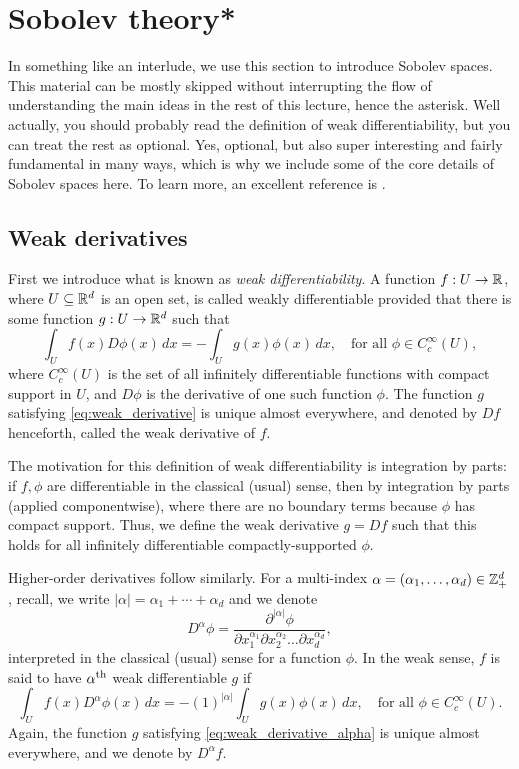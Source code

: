 \documentclass{article}
\begin{document}
\section{Sobolev theory*}

In something like an interlude, we use this section to introduce Sobolev
spaces. This material can be mostly skipped without interrupting the flow of
understanding the main ideas in the rest of this lecture, hence the
asterisk. Well actually, you should probably read the definition of weak
differentiability, but you can treat the rest as optional. Yes, optional, but
also super interesting and fairly fundamental in many ways, which is why we
include some of the core details of Sobolev spaces here. To learn more, an
excellent reference is \citet{evans2010partial}.  

\subsection{Weak derivatives}

First we introduce what is known as \emph{weak differentiability}. A function $f
: U \to \mathbb{R}$, where $U \subseteq \mathbb{R}^d$ is an open set, is called weakly
differentiable provided that there is some function $g : U \to \mathbb{R}^d$ such that
\begin{equation}
\label{eq:weak_derivative}
\int_U f(x) D \phi(x) \, dx = - \int_U g(x) \phi(x) \, dx,
\quad \text{for all $\phi \in C_c^\infty(U)$}, 
\end{equation}
where $C_c^\infty(U)$ is the set of all infinitely differentiable functions with
compact support in $U$, and $D\phi$ is the derivative of one such function
$\phi$. The function $g$ satisfying \eqref{eq:weak_derivative} is unique almost
everywhere, and denoted by $Df$ henceforth, called the weak derivative of $f$.

The motivation for this definition of weak differentiability is integration by
parts: if $f,\phi$ are differentiable in the classical (usual) sense, then
 by
integration by parts (applied componentwise), where there are no boundary terms
because $\phi$ has compact support. Thus, we define the weak derivative $g = Df$
such that this holds for all infinitely differentiable compactly-supported
$\phi$.

Higher-order derivatives follow similarly. For a multi-index
$\alpha=(\alpha_1,\dots,\alpha_d) \in \mathbb{Z}^d_+$, recall, we write $|\alpha| =
\alpha_1 + \cdots + \alpha_d$ and we denote  
\[
D^\alpha \phi = \frac{\partial^{|\alpha|} \phi}{\partial x_1^{\alpha_1} \partial 
  x_2^{\alpha_2} \dots \partial x_d^{\alpha_d}},
\]
interpreted in the classical (usual) sense for a function $\phi$. In the weak
sense, $f$ is said to have $\alpha^{\text{th}}$ weak differentiable $g$ if 
\begin{equation}
\label{eq:weak_derivative_alpha}
\int_U f(x) D^\alpha \phi(x) \, dx = - (1)^{|\alpha|} \int_U g(x) \phi(x) \, dx,
\quad \text{for all $\phi \in C_c^\infty(U)$}.   
\end{equation}
Again, the function $g$ satisfying \eqref{eq:weak_derivative_alpha} is unique
almost everywhere, and we denote by $D^\alpha f$.
\end{document}
